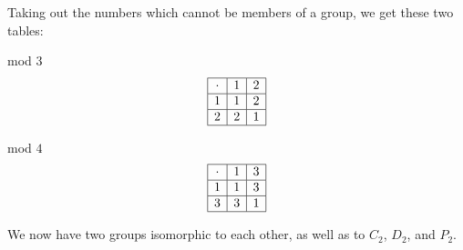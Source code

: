 \documentclass[../gatm.tex]{subfiles}
\begin{document}
Taking out the numbers which cannot be members of a group, we get these two tables:

\vspace{1ex}
\begin{minipage}{0.5\textwidth}
\centering
mod $3$
$$\begin{array}{|c|c|c|}
\hline
\cdot & 1 & 2 \\ \hline
1 & 1 & 2 \\ \hline
2 & 2 & 1 \\ \hline
\end{array}$$
\end{minipage}\hfill
\begin{minipage}{0.5\textwidth}
\centering
mod $4$
$$\begin{array}{|c|c|c|}
\hline
\cdot & 1 & 3 \\ \hline
1 & 1 & 3 \\ \hline
3 & 3 & 1 \\ \hline
\end{array}$$
\end{minipage}
\vspace{1ex}

We now have two groups isomorphic to each other, as well as to $C_2$, $D_2$, and $P_2$.
\end{document}
